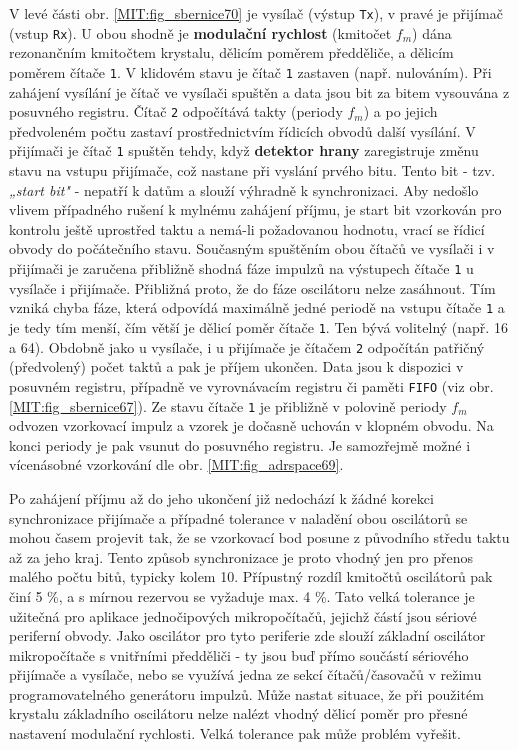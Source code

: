         V levé části obr. \ref{MIT:fig_sbernice70} je vysílač (výstup \texttt{Tx}), v pravé je
        přijímač (vstup \texttt{Rx}). U obou shodně je \textbf{modulační rychlost} (kmitočet
        \(f_m\)) dána rezonančním kmitočtem krystalu, dělicím poměrem předděliče, a dělicím poměrem
        čítače \texttt{1}. V klidovém stavu je čítač \texttt{1} zastaven (např. nulováním). Při
        zahájení vysílání je čítač ve vysílači spuštěn a data jsou bit za bitem vysouvána z
        posuvného registru. Čítač \texttt{2} odpočítává takty (periody \(f_m\)) a po jejich
        předvoleném počtu zastaví prostřednictvím řídicích obvodů další vysílání. V přijímači je
        čítač \texttt{1} spuštěn tehdy, když \textbf{detektor hrany} zaregistruje změnu stavu na
        vstupu přijímače, což nastane při vyslání prvého bitu. Tento bit - tzv. \emph{„start bit"} -
        nepatří k datům a slouží výhradně k synchronizaci. Aby nedošlo vlivem případného rušení k
        mylnému zahájení příjmu, je start bit vzorkován pro kontrolu ještě uprostřed taktu a nemá-li
        požadovanou hodnotu, vrací se řídicí obvody do počátečního stavu. Současným spuštěním obou
        čítačů ve vysílači i v přijímači je zaručena přibližně shodná fáze impulzů na výstupech
        čítače \texttt{1} u vysílače i přijímače. Přibližná proto, že do fáze oscilátoru nelze
        zasáhnout. Tím vzniká chyba fáze, která odpovídá maximálně jedné periodě na vstupu čítače
        \texttt{1} a je tedy tím menší, čím větší je dělicí poměr čítače \texttt{1}. Ten bývá
        volitelný (např. 16 a 64). Obdobně jako u vysílače, i u přijímače je čítačem \texttt{2}
        odpočítán patřičný (předvolený) počet taktů a pak je příjem ukončen. Data jsou k dispozici v
        posuvném registru, případně ve vyrovnávacím registru či paměti \texttt{FIFO} (viz obr.
        \ref{MIT:fig_sbernice67}). Ze stavu čítače \texttt{1} je přibližně v polovině periody
        \(f_m\) odvozen vzorkovací impulz a vzorek je dočasně uchován v klopném obvodu. Na konci
        periody je pak vsunut do posuvného registru. Je samozřejmě možné i vícenásobné vzorkování
        dle obr. \ref{MIT:fig_adrspace69}.
        
        Po zahájení příjmu až do jeho ukončení již nedochází k žádné korekci synchronizace přijímače
        a případné tolerance v naladění obou oscilátorů se mohou časem projevit tak, že se
        vzorkovací bod posune z původního středu taktu až za jeho kraj. Tento způsob synchronizace
        je proto vhodný jen pro přenos malého počtu bitů, typicky kolem 10. Přípustný rozdíl
        kmitočtů oscilátorů pak činí 5 \%, a s mírnou rezervou se vyžaduje max. 4 \%. Tato velká
        tolerance je užitečná pro aplikace jednočipových mikropočítačů, jejichž částí jsou sériové
        periferní obvody. Jako oscilátor pro tyto periferie zde slouží základní oscilátor
        mikropočítače s vnitřními předděliči - ty jsou buď přímo součástí sériového přijímače a
        vysílače, nebo se využívá jedna ze sekcí čítačů/časovačů v režimu programovatelného
        generátoru impulzů. Může nastat situace, že při použitém krystalu základního oscilátoru
        nelze nalézt vhodný dělicí poměr pro přesné nastavení modulační rychlosti. Velká tolerance
        pak může problém vyřešit.
               
